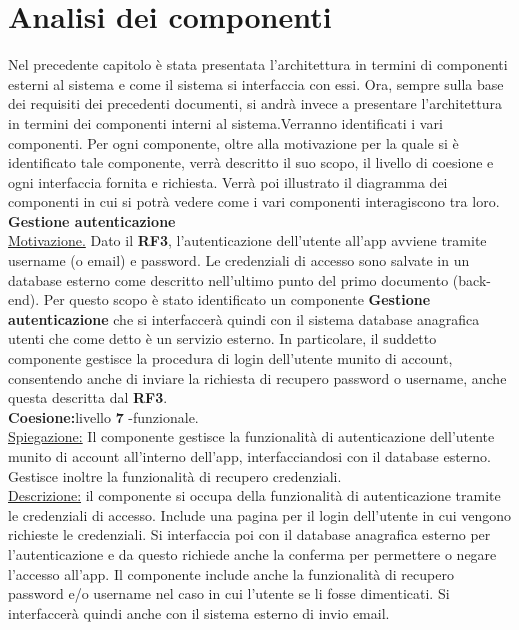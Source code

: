 \documentclass{article}
\begin{document}
      \section{Analisi dei componenti}
      Nel precedente capitolo è stata presentata l'architettura in termini di componenti esterni al sistema e come il sistema si interfaccia con essi. Ora, sempre sulla base dei
      requisiti dei precedenti documenti, si andrà invece a presentare l’architettura in termini dei componenti interni al sistema.Verranno identificati i vari componenti. Per ogni
      componente, oltre alla motivazione per la quale si è identificato tale componente, verrà descritto il suo scopo, il livello di coesione e ogni interfaccia fornita e richiesta.
      Verrà poi illustrato il diagramma dei componenti in cui si potrà vedere come i vari componenti interagiscono tra loro.\\


      {\Large\textbf{Gestione autenticazione}}\\

      \underline{Motivazione.} Dato il \textbf{RF3}, l’autenticazione dell’utente all’app avviene tramite username (o email) e password. Le credenziali di accesso sono salvate in un
      database esterno come descritto nell’ultimo punto del primo documento (back-end). Per questo scopo è stato identificato un componente \textbf{Gestione autenticazione} che si
      interfaccerà quindi con il sistema database anagrafica utenti che come detto è un servizio esterno. In particolare, il suddetto componente gestisce la procedura di login
      dell’utente munito di account, consentendo anche di inviare la richiesta di recupero password o username, anche questa descritta dal \textbf{RF3}.\\

      \textbf{Coesione:}livello \textbf{7} -funzionale.\\

      \underline{Spiegazione:} Il componente gestisce la funzionalità di autenticazione dell’utente munito di account all’interno dell’app, interfacciandosi con il database esterno.
      Gestisce inoltre la funzionalità di recupero credenziali.\\

      \underline{Descrizione:} il componente si occupa della funzionalità di autenticazione tramite le credenziali di accesso. Include una pagina per il login dell’utente in cui
      vengono richieste le credenziali. Si interfaccia poi con il database anagrafica esterno per l’autenticazione e da questo richiede anche la conferma per permettere o negare 
      l’accesso all’app. Il componente include anche la funzionalità di recupero password e/o username nel caso in cui l’utente se li fosse dimenticati. Si interfaccerà quindi anche
      con il sistema esterno di invio email.\\
\end{document}
